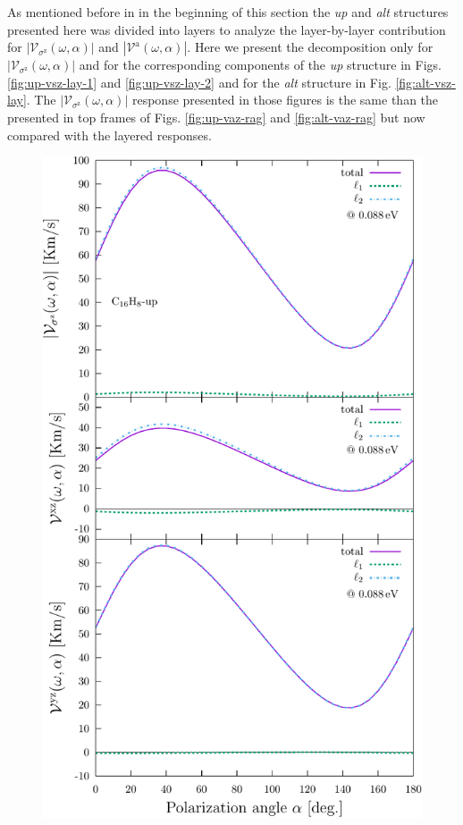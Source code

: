 \documentclass[prb,11pt,tightenlines,twocolumn,aps]{revtex4-1}
\begin{document}
{\color{blue} As mentioned before in in the beginning of this section the
\emph{up} and \emph{alt} structures presented here was divided into layers to
analyze the layer-by-layer contribution for
$|\mathcal{V}_{\sigma^{\mathrm{z}}}(\omega,\alpha)|$ and
$|\mathcal{V}^{\mathrm{a}}(\omega,\alpha)|$. Here we present the decomposition
only for $|\mathcal{V}_{\sigma^{\mathrm{z}}}(\omega,\alpha)|$ and for the
corresponding components of the \emph{up} structure in Figs. 
% 
\ref{fig:up-vsz-lay-1} and \ref{fig:up-vsz-lay-2} and for the \emph{alt}
structure in Fig. \ref{fig:alt-vsz-lay}. The
$|\mathcal{V}_{\sigma^{\mathrm{z}}}(\omega,\alpha)|$ response presented in
those figures is the same than the presented in top frames of Figs.
% 
\ref{fig:up-vaz-rag} and \ref{fig:alt-vaz-rag} but now compared with the
layered responses.
% 
}
% 
\begin{figure}[t]
    \centering
    \includegraphics[width=\linewidth]{upplots/up-svaz-lay-1}
    

\end{figure}
\end{document}
